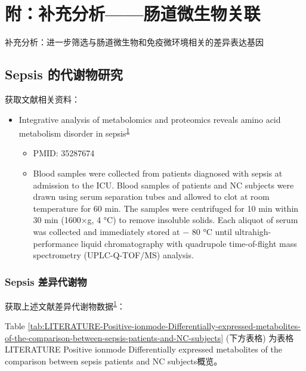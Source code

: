 \documentclass[
]{article}
\providecommand{\tightlist}{%
  \setlength{\itemsep}{0pt}\setlength{\parskip}{0pt}}
\begin{document}
\hypertarget{supp}{%
\section{附：补充分析------肠道微生物关联}\label{supp}}

补充分析：进一步筛选与肠道微生物和免疫微环境相关的差异表达基因

\hypertarget{sepsis-ux7684ux4ee3ux8c22ux7269ux7814ux7a76}{%
\subsection{Sepsis 的代谢物研究}\label{sepsis-ux7684ux4ee3ux8c22ux7269ux7814ux7a76}}

获取文献相关资料：

\begin{itemize}
\tightlist
\item
  Integrative analysis of metabolomics and proteomics reveals amino acid
  metabolism disorder in sepsis\textsuperscript{\protect\hyperlink{ref-IntegrativeAnaChen2022}{1}}

  \begin{itemize}
  \tightlist
  \item
    PMID: 35287674
  \item
    Blood samples were collected from patients diagnosed with sepsis at
    admission to the ICU. Blood samples of patients and NC subjects were
    drawn using serum separation tubes and allowed to clot at room
    temperature for 60 min. The samples were centrifuged for 10 min within 30
    min (1600×g, 4 °C) to remove insoluble solids. Each aliquot of serum was
    collected and immediately stored at − 80 °C until ultrahigh-performance
    liquid chromatography with quadrupole time-of-flight mass spectrometry
    (UPLC-Q-TOF/MS) analysis.
  \end{itemize}
\end{itemize}

\hypertarget{diff-meta}{%
\subsubsection{Sepsis 差异代谢物}\label{diff-meta}}

获取上述文献差异代谢物数据\textsuperscript{\protect\hyperlink{ref-IntegrativeAnaChen2022}{1}}：

Table \ref{tab:LITERATURE-Positive-ionmode-Differentially-expressed-metabolites-of-the-comparison-between-sepsis-patients-and-NC-subjects} (下方表格) 为表格LITERATURE Positive ionmode Differentially expressed metabolites of the comparison between sepsis patients and NC subjects概览。
\end{document}
